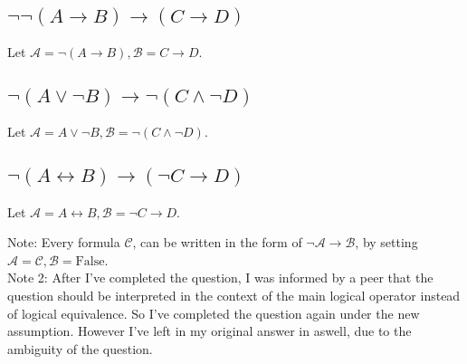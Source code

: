 \documentclass[10pt, letterpaper, titlepage]{article}
\newcommand{\A}{\mathscr{A}}
\newcommand{\B}{\mathscr{B}}
\newcommand{\C}{\mathscr{C}}
\newcommand{\lra}{\leftrightarrow}
\begin{document}
\begin{multicols}{2}
            \subsection{$\lnot \lnot (A \to  B) \to  (C \to  D)$}
                Let $\A = \lnot (A \to  B), \B = C \to  D$.
            \subsection{$\lnot (A \lor  \lnot B) \to  \lnot (C \land  \lnot D)$}
                Let $\A = A \lor  \lnot B, \B = \lnot (C \land  \lnot D)$.
            \subsection{$\lnot (A \lra  B) \to  (\lnot C \to  D)$}
                Let $\A = A \lra  B, \B = \lnot C \to  D$.
        \end{multicols}
        \noindent
        Note: Every formula $\C$, can be written in the form of $\lnot \A \to \B$,
        by setting $\A = \C, \B = \text{False}$.\\
        Note 2: After I've completed the question, 
        I was informed by a peer that the question should be interpreted in the context of 
        the main logical operator instead of logical equivalence. So I've completed the question again 
        under the new assumption. However I've left in my original answer in aswell, due to the ambiguity of the question.
    
\end{document}

